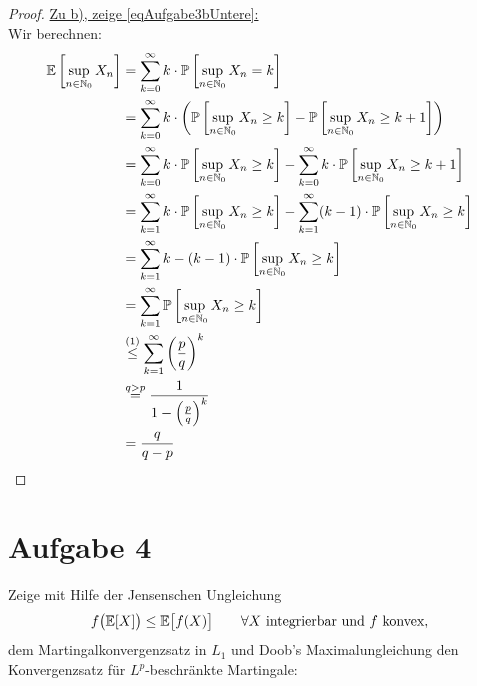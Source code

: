 \documentclass[12pt,a4paper]{article}
\begin{document}
\begin{proof}
\underline{Zu b), zeige \eqref{eqAufgabe3bUntere}:}\\
Wir berechnen:
\begin{align*}
	\mathbb{E}\left[\sup\limits_{n\in \mathbb{N}_0}X_n\right] 
	&= \sum\limits_{k=0}^\infty k\cdot \mathbb{P}\left[\sup\limits_{n\in \mathbb{N}_0}X_n = k\right] \\
	&= \sum\limits_{k=0}^\infty k\cdot\left( \mathbb{P}\left[\sup\limits_{n\in \mathbb{N}_0}X_n \geq k\right] - \mathbb{P}\left[\sup\limits_{n\in \mathbb{N}_0}X_n \geq k+1\right]\right)\\
	&= \sum\limits_{k=0}^\infty k\cdot\mathbb{P}\left[\sup\limits_{n\in \mathbb{N}_0}X_n \geq k\right] - \sum\limits_{k=0}^\infty k \cdot \mathbb{P}\left[\sup\limits_{n\in \mathbb{N}_0}X_n \geq k+1\right]\\
	&= \sum\limits_{k=1}^\infty k\cdot\mathbb{P}\left[\sup\limits_{n\in \mathbb{N}_0}X_n \geq k\right] - \sum\limits_{k=1}^\infty (k-1) \cdot \mathbb{P}\left[\sup\limits_{n\in \mathbb{N}_0}X_n \geq k\right]\\
	&= \sum\limits_{k=1}^\infty k - (k-1) \cdot \mathbb{P}\left[\sup\limits_{n\in \mathbb{N}_0}X_n \geq k\right]\\
	&= \sum\limits_{k=1}^\infty \mathbb{P}\left[\sup\limits_{n\in \mathbb{N}_0}X_n \geq k\right]\\
	&\stackrel{(1)}{\leq}\sum\limits_{k=1}^\infty \left(\frac{p}{q}\right)^k\\
	&\stackrel{q >p}{=}\frac{1}{1-\left(\frac{p}{q}\right)^k} \\
	&= \frac{q}{q-p}
\end{align*}

\end{proof}

\section*{Aufgabe 4}
Zeige mit Hilfe der Jensenschen Ungleichung
\begin{align}\label{eqJensenscheUngleichung}
f\big(\mathbb{E}[X]\big)\leq\mathbb{E}\big[f(X)\big]\qquad\forall X\text{ integrierbar und $f$ konvex},
\end{align}
dem Martingalkonvergenzsatz in $L_1$ und Doob's Maximalungleichung den Konvergenzsatz für $L^p$-beschränkte Martingale:
\end{document}
